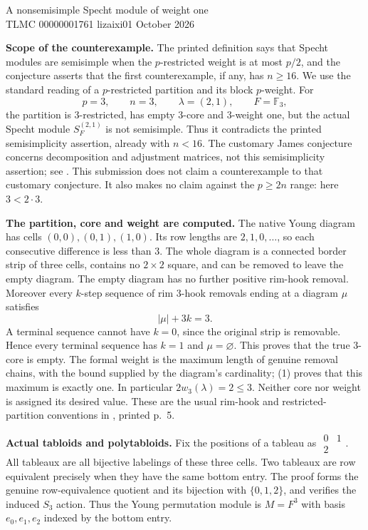 \documentclass[10pt,a4paper]{article}
\begin{document}
\begin{center}
{\Large A nonsemisimple Specht module of weight one}\\[4pt]
TLMC 00000001761 \quad lizaixi01  October 2026
\end{center}

\textbf{Scope of the counterexample.}
The printed definition says that Specht modules are semisimple when the
$p$-restricted weight is at most $p/2$, and the conjecture asserts that the
first counterexample, if any, has $n\ge16$. We use the standard reading of
a $p$-restricted partition and its block $p$-weight. For
\[
 p=3,\qquad n=3,\qquad \lambda=(2,1),\qquad F=\mathbb F_3,
\]
the partition is $3$-restricted, has empty $3$-core and $3$-weight one, but
the actual Specht module $S^{(2,1)}_F$ is not semisimple.
Thus it contradicts the printed semisimplicity assertion, already with $n<16$.
The customary James conjecture concerns decomposition and adjustment matrices,
not this semisimplicity assertion; see \cite{james}. This submission does not
claim a counterexample to that customary conjecture. It also makes no claim
against the $p\ge2n$ range: here $3<2\cdot3$.

\textbf{The partition, core and weight are computed.}
The native Young diagram has cells $(0,0),(0,1),(1,0)$. Its row lengths are
$2,1,0,\ldots$, so each consecutive difference is less than $3$.
The whole diagram is a connected border strip of three cells, contains no
$2\times2$ square, and can be removed to leave the empty diagram.
The empty diagram has no further positive rim-hook removal. Moreover every
$k$-step sequence of rim $3$-hook removals ending at a diagram $\mu$ satisfies
\[
 |\mu|+3k=3. \tag{1}
\]
A terminal sequence cannot have $k=0$, since the original strip is removable.
Hence every terminal sequence has $k=1$ and $\mu=\varnothing$.
This proves that the true $3$-core is empty. The formal weight is the maximum
length of genuine removal chains, with the bound supplied by the diagram's
cardinality; (1) proves that this maximum is exactly one. In particular
$2w_3(\lambda)=2\le3$. Neither core nor weight is assigned its desired value.
These are the usual rim-hook and restricted-partition conventions in
\cite{jiang}, printed p.~5.

\textbf{Actual tabloids and polytabloids.}
Fix the positions of a tableau as
$\begin{smallmatrix}0&1\\2&\end{smallmatrix}$.
All tableaux are all bijective labelings of these three cells. Two tableaux
are row equivalent precisely when they have the same bottom entry.
The proof forms the genuine row-equivalence quotient and its bijection with
$\{0,1,2\}$, and verifies the induced $S_3$ action. Thus the Young permutation
module is $M=F^3$ with basis $e_0,e_1,e_2$ indexed by the bottom entry.
\end{document}

